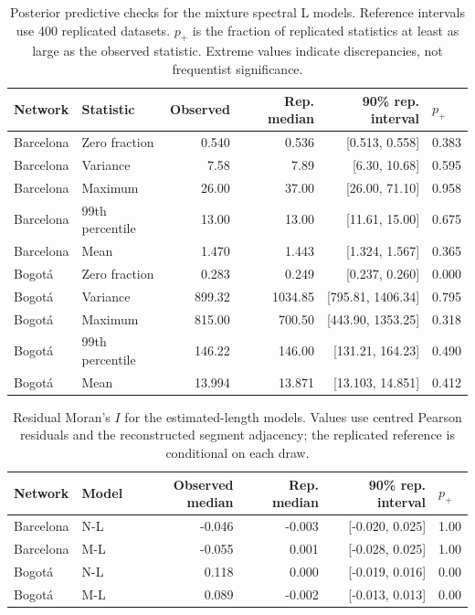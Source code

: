 \documentclass[11pt]{article}
\begin{document}
\FloatBarrier
\begin{table}[!htbp]\centering\small
\caption{Posterior predictive checks for the mixture spectral L models. Reference intervals use 400 replicated datasets. $p_+$ is the fraction of replicated statistics at least as large as the observed statistic. Extreme values indicate discrepancies, not frequentist significance.}
\begin{tabular}{llrrrl}\toprule Network & Statistic & Observed & Rep. median & 90\% rep. interval & $p_+$\\\midrule
Barcelona & Zero fraction & 0.540 & 0.536 & [0.513, 0.558] & 0.383 \\
Barcelona & Variance & 7.58 & 7.89 & [6.30, 10.68] & 0.595 \\
Barcelona & Maximum & 26.00 & 37.00 & [26.00, 71.10] & 0.958 \\
Barcelona & 99th percentile & 13.00 & 13.00 & [11.61, 15.00] & 0.675 \\
Barcelona & Mean & 1.470 & 1.443 & [1.324, 1.567] & 0.365 \\
Bogot\'a & Zero fraction & 0.283 & 0.249 & [0.237, 0.260] & 0.000 \\
Bogot\'a & Variance & 899.32 & 1034.85 & [795.81, 1406.34] & 0.795 \\
Bogot\'a & Maximum & 815.00 & 700.50 & [443.90, 1353.25] & 0.318 \\
Bogot\'a & 99th percentile & 146.22 & 146.00 & [131.21, 164.23] & 0.490 \\
Bogot\'a & Mean & 13.994 & 13.871 & [13.103, 14.851] & 0.412 \\
\bottomrule\end{tabular}\end{table}
\FloatBarrier
\begin{table}[!htbp]\centering\small
\caption{Residual Moran's $I$ for the estimated-length models. Values use centred Pearson residuals and the reconstructed segment adjacency; the replicated reference is conditional on each draw.}
\begin{tabular}{llrrrl}\toprule Network & Model & Observed median & Rep. median & 90\% rep. interval & $p_+$\\\midrule
Barcelona & N-L & -0.046 & -0.003 & [-0.020, 0.025] & 1.00 \\
Barcelona & M-L & -0.055 & 0.001 & [-0.028, 0.025] & 1.00 \\
Bogot\'a & N-L & 0.118 & 0.000 & [-0.019, 0.016] & 0.00 \\
Bogot\'a & M-L & 0.089 & -0.002 & [-0.013, 0.013] & 0.00 \\
\bottomrule\end{tabular}\end{table}
\FloatBarrier
\end{document}
